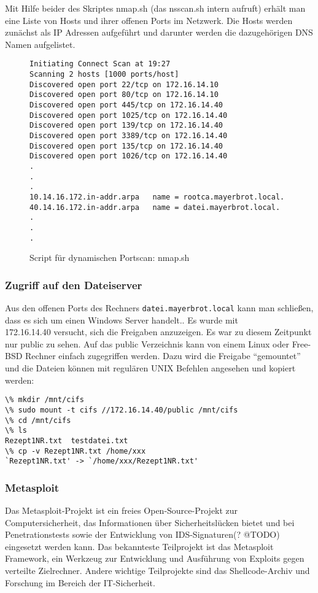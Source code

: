 Mit Hilfe beider des Skriptes nmap.sh (das nsscan.sh intern aufruft) erhält man
eine Liste von Hosts und ihrer offenen Ports im Netzwerk. Die Hosts werden
zunächst als IP Adressen aufgeführt und darunter werden die dazugehörigen DNS
Namen aufgelistet.
\begin{figure}
\begin{lstlisting}
Initiating Connect Scan at 19:27
Scanning 2 hosts [1000 ports/host]
Discovered open port 22/tcp on 172.16.14.10
Discovered open port 80/tcp on 172.16.14.10
Discovered open port 445/tcp on 172.16.14.40
Discovered open port 1025/tcp on 172.16.14.40
Discovered open port 139/tcp on 172.16.14.40
Discovered open port 3389/tcp on 172.16.14.40
Discovered open port 135/tcp on 172.16.14.40
Discovered open port 1026/tcp on 172.16.14.40
.
.
.
10.14.16.172.in-addr.arpa	name = rootca.mayerbrot.local.
40.14.16.172.in-addr.arpa	name = datei.mayerbrot.local.
.
.
.
\end{lstlisting}
\caption{Script für dynamischen Portscan: nmap.sh}
\end{figure}

\subsubsection{Zugriff auf den Dateiserver}

Aus den offenen Ports des Rechners \lstinline{datei.mayerbrot.local} kann man
schließen, dass es sich um einen Windows Server handelt.. Es wurde mit
\\172.16.14.40 versucht, sich die Freigaben anzuzeigen. Es war zu diesem
Zeitpunkt nur public zu sehen. Auf das public Verzeichnis kann von einem Linux
oder Free-BSD Rechner einfach zugegriffen werden. Dazu wird die Freigabe
``gemountet'' und die Dateien können mit regulären UNIX Befehlen angesehen und
kopiert werden:

\begin{lstlisting}
\% mkdir /mnt/cifs
\% sudo mount -t cifs //172.16.14.40/public /mnt/cifs
\% cd /mnt/cifs
\% ls
Rezept1NR.txt  testdatei.txt
\% cp -v Rezept1NR.txt /home/xxx
`Rezept1NR.txt' -> `/home/xxx/Rezept1NR.txt'
\end{lstlisting}

\subsubsection{Metasploit}

Das Metasploit-Projekt ist ein freies Open-Source-Projekt zur
Computersicherheit, das Informationen über Sicherheitslücken bietet und bei
Penetrationstests sowie der Entwicklung von IDS-Signaturen(? @TODO) eingesetzt
werden kann. Das bekannteste Teilprojekt ist das Metasploit Framework, ein
Werkzeug zur Entwicklung und Ausführung von Exploits gegen verteilte
Zielrechner. Andere wichtige Teilprojekte sind das Shellcode-Archiv und
Forschung im Bereich der IT-Sicherheit.

\begin{lstlisting}

\end{lstlisting}
